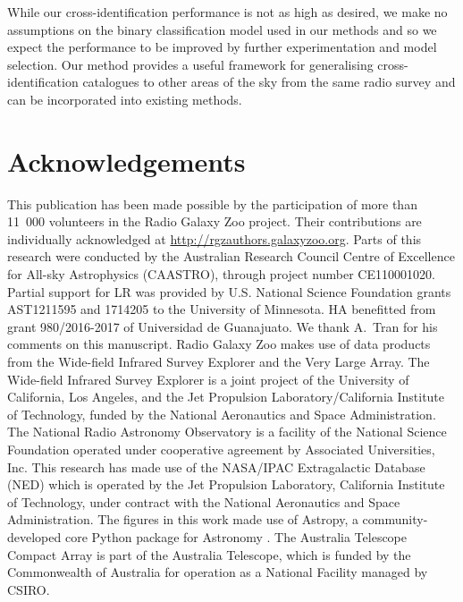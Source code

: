 \documentclass[fleqn,usenatbib,usedcolumn]{mnras}
\begin{document}
  While our cross-identification performance is not as high as desired, we
  make no assumptions on the binary classification model used in our methods
  and so we expect the performance to be improved by further experimentation
  and model selection. Our method provides a useful framework for generalising
  cross-identification catalogues to other areas of the sky from the same radio survey and can be
  incorporated into existing methods.

\section{Acknowledgements}

  This publication has been made possible by the participation of more than 11~000 volunteers in the Radio Galaxy Zoo project. Their contributions are individually acknowledged at \url{http://rgzauthors.galaxyzoo.org}. Parts of this research were conducted by the Australian Research Council Centre of Excellence for All-sky Astrophysics (CAASTRO), through project number CE110001020. Partial support for LR was provided by U.S. National Science Foundation grants AST1211595 and 1714205 to the University of Minnesota. HA benefitted from grant 980/2016-2017 of Universidad de Guanajuato. We thank A.~Tran for his comments on this manuscript. Radio Galaxy Zoo makes use of data products from the Wide-field Infrared Survey Explorer and the Very Large Array. The Wide-field Infrared Survey Explorer is a joint project of the University of California, Los Angeles, and the Jet Propulsion Laboratory/California Institute of Technology, funded by the National Aeronautics and Space Administration. The National Radio Astronomy Observatory is a facility of the National Science Foundation operated under cooperative agreement by Associated Universities, Inc. This research has made use of the NASA/IPAC Extragalactic Database (NED) which is operated by the Jet Propulsion Laboratory, California Institute of Technology, under contract with the National Aeronautics and Space Administration. The figures in this work made use of Astropy, a community-developed core Python package for Astronomy \citep{astropy}. The Australia Telescope Compact Array is part of the Australia Telescope, which is funded by the Commonwealth of Australia for operation as a National Facility managed by CSIRO.

%



\end{document}
